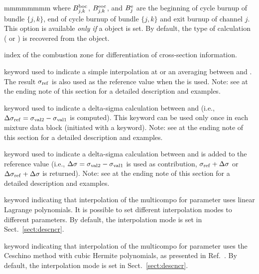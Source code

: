 \begin{ListeDeDescription}{mmmmmmmm}
\noindent where $B_{j,k}^{\rm boc}$, $B_{j,k}^{\rm eoc}$, and $B_j^{\rm e}$ are the beginning of cycle burnup of bundle $\{j,k\}$, end of cycle burnup of bundle $\{j,k\}$ and exit burnup of channel $j$. This option is available {\sl only if} a  object is set.
By default, the type of calculation ( or ) is recovered from the  object.

\item[\dusa{ivarty}] index of the combustion zone for differentiation of cross-section information.

\item[\moc{SET}] keyword used to indicate a simple interpolation at  or an averaging between  and . The result $\sigma_{\rm ref}$ is also used as the reference value when the  is used. Note: see at the ending note of this section for a detailed description and examples.

\item[\moc{DELTA}] keyword used to indicate a delta-sigma calculation between  and 
(i.e., $\Delta\sigma_{\rm ref}=\sigma_{\rm val2}-\sigma_{\rm val1}$ is computed). This keyword can be used only once in each mixture data block (initiated
with a  keyword).  Note: see at the ending note of this section for a detailed description and examples.

\item[\moc{ADD}] keyword used to indicate a delta-sigma calculation between  and  is added to the reference value
(i.e., $\Delta\sigma=\sigma_{\rm val2}-\sigma_{\rm val1}$ is used as contribution, $\sigma_{\rm ref}+\Delta\sigma$ or $\Delta\sigma_{\rm ref}+\Delta\sigma$ is returned). Note: see at the ending note of this section for a detailed description and examples.

\item[\moc{LINEAR}] keyword indicating that interpolation of the {\sc multicompo} for parameter  uses linear Lagrange
polynomials. It is possible to set different interpolation modes to different parameters. By default, the interpolation mode is set in Sect.~\ref{sect:descncr}.

\item[\moc{CUBIC}] keyword indicating that interpolation of the {\sc multicompo} for parameter  uses the Ceschino method
with cubic Hermite polynomials, as presented in Ref.~. By default, the interpolation mode is set in Sect.~\ref{sect:descncr}.


\end{ListeDeDescription}

